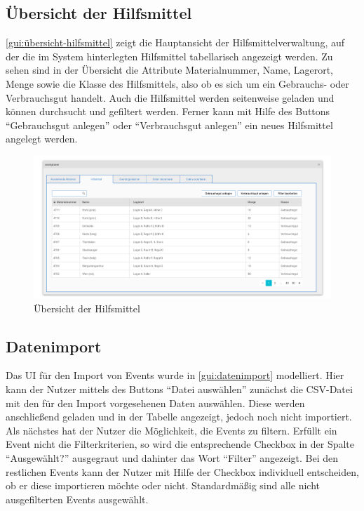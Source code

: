 \newpage
\FloatBarrier
\subsection{Übersicht der Hilfsmittel}
\autoref{gui:übersicht-hilfsmittel} zeigt die Hauptansicht der Hilfsmittelverwaltung, auf der die im System hinterlegten Hilfsmittel tabellarisch angezeigt werden. Zu sehen sind in der Übersicht die Attribute Materialnummer, Name, Lagerort, Menge sowie die Klasse des Hilfsmittels, also ob es sich um ein Gebrauchs- oder Verbrauchsgut handelt. Auch die Hilfsmittel werden seitenweise geladen und können durchsucht und gefiltert werden. Ferner kann mit Hilfe des Buttons \enquote{Gebrauchsgut anlegen} oder \enquote{Verbrauchsgut anlegen} ein neues Hilfsmittel angelegt werden.

\begin{figure}[ht!]
    \centering
    \includegraphics[width=0.98\columnwidth]{Bilder/mockup_hilfsmittel.png}
    \caption{Übersicht der Hilfsmittel}
    \label{gui:übersicht-hilfsmittel}
\end{figure}

\newpage
\FloatBarrier
\subsection{Datenimport}
Das UI für den Import von Events wurde in \autoref{gui:datenimport} modelliert. Hier kann der Nutzer mittels des Buttons \enquote{Datei auswählen} zunächst die CSV-Datei mit den für den Import vorgesehenen Daten auswählen. Diese werden anschließend geladen und in der Tabelle angezeigt, jedoch noch nicht importiert. Als nächstes hat der Nutzer die Möglichkeit, die Events zu filtern. Erfüllt ein Event nicht die Filterkriterien, so wird die entsprechende Checkbox in der Spalte \enquote{Ausgewählt?} ausgegraut und dahinter das Wort \enquote{Filter} angezeigt. Bei den restlichen Events kann der Nutzer mit Hilfe der Checkbox individuell entscheiden, ob er diese importieren möchte oder nicht. Standardmäßig sind alle nicht ausgefilterten Events ausgewählt.

